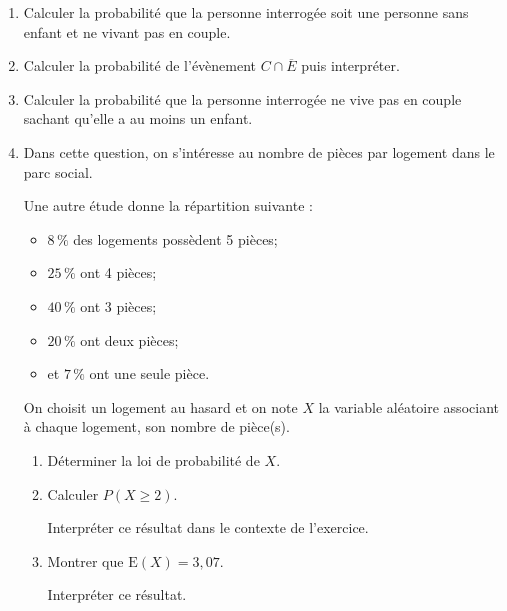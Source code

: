 \documentclass[10pt]{article}
\begin{document}
	\begin{enumerate}
		\item Calculer la probabilité que la personne interrogée soit une personne sans enfant et ne vivant pas en couple.

		\item Calculer la probabilité de l'évènement $C \cap \overline{E}$ puis interpréter.

		\item Calculer la probabilité que la personne interrogée ne vive pas en couple sachant qu'elle a au moins un enfant.

		\item Dans cette question, on s'intéresse au nombre de pièces par logement dans le parc social.

		Une autre étude donne la répartition suivante :
		\begin{itemize}[label={\textbullet~}]
			\item $8\,\%$ des logements possèdent 5 pièces;
			\item $25\,\%$ ont 4 pièces;
			\item $40\,\%$ ont 3 pièces;
			\item $20\,\%$ ont deux pièces;
			\item et $7\,\%$ ont une seule pièce.
		\end{itemize}
		On choisit un logement au hasard et on note $X$ la variable aléatoire associant à chaque logement, son nombre de pièce(s).

		\begin{enumerate}
			\item Déterminer la loi de probabilité de $X$.

			\item Calculer $P(X \geqslant  2)$.

			Interpréter ce résultat dans le contexte de l'exercice.

			\item Montrer que $\mathrm{E}(X)=3,07$.

			Interpréter ce résultat.
		\end{enumerate}
	\end{enumerate}
\end{document}

